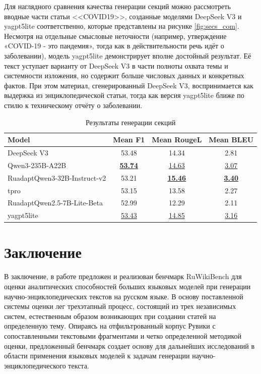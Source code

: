 \documentclass{article}
\begin{document}
Для наглядного сравнения качества генерации секций можно рассмотреть вводные части статьи <<COVID19>>, 
созданные моделями DeepSeek V3 и yagpt5lite соответственно, которые представлены на рисунке \ref{fig:secs_com}.
Несмотря на отдельные смысловые неточности (например, утверждение «COVID-19 - это пандемия», тогда как в действительности речь идёт о заболевании), 
модель yagpt5lite демонстрирует вполне достойный результат. Её текст уступает варианту от DeepSeek V3 в части полноты охвата темы и системности изложения, 
но содержит больше числовых данных и конкретных фактов. При этом материал, сгенерированный DeepSeek V3, воспринимается как выдержка из энциклопедической статьи, 
тогда как версия yagpt5lite ближе по стилю к техническому отчёту о заболевании.

\begin{table}[ht!]
\centering
\caption{Результаты генерации секций}
\begin{tabular}{l|c|c|c}
\hline
\textbf{Model} & \textbf{Mean F1} & \textbf{Mean RougeL} & \textbf{Mean BLEU} \\
\hline
DeepSeek V3                                         & 53.48 & 14.34 & 2.81 \\
Qwen3-235B-A22B                                     & \uline{\textbf{53.74}} & \uline{14.63} & \uline{3.07} \\
\hline
RuadaptQwen3-32B-Instruct-v2                        & 53.21 & \uline{\textbf{15.46}} & \uline{\textbf{3.40}} \\
tpro                                                & 53.15 & 13.58 & 2.27 \\
\hline
RuadaptQwen2.5-7B-\allowbreak Lite-\allowbreak Beta & 52.99 & 12.29 & 2.11 \\
yagpt5lite                                          & \uline{53.43} & \uline{14.85} & \uline{3.16} \\
\hline
\end{tabular}
\label{tab:secs}
\end{table}

\FloatBarrier
\section*{Заключение}
В заключение, в работе предложен и реализован бенчмарк RuWikiBench для оценки аналитических способностей больших языковых моделей при генерации научно-энциклопедических текстов на русском языке.
В основу поставленной системы оценки лег трехэтапный процесс, состоящий из трех независимых систем, естественным образом возникающих при создании статей на определенную тему.
Опираясь на отфильтрованный корпус Рувики с сопоставленными текстовыми фрагментами и четко определенной методикой оценки, 
предложенный бенчмарк создает основу для дальнейших исследований в области применения языковых моделей к задачам генерации научно-энциклопедического текста. 
\end{document}
